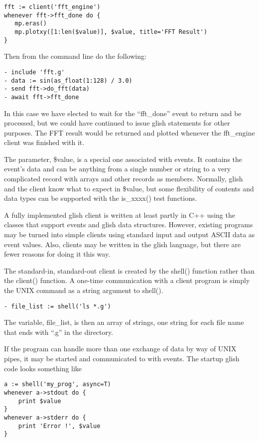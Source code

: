 \begin{verbatim}
fft := client('fft_engine')
whenever fft->fft_done do {
   mp.eras()
   mp.plotxy([1:len($value)], $value, title='FFT Result')
}
\end{verbatim}

Then from the command line do the following:

\begin{verbatim}
- include 'fft.g'
- data := sin(as_float(1:128) / 3.0)
- send fft->do_fft(data)
- await fft->fft_done
\end{verbatim}

    In this case we have elected to wait for the ``fft\_done'' event to return
and be processed, but we could have continued to issue glish statements for
other purposes.  The FFT result would be returned and plotted whenever the
fft\_engine client was finished with it.

    The parameter, \$value, is a special one associated with events.  It
contains the event's data and can be anything from a single number or
string to a very complicated record with arrays and other records as
members.  Normally, glish and the client know what to expect in \$value, but
some flexibility of contents and data types can be supported with the
is\_xxxx() test functions.

    A fully implemented glish client is written at least partly in C++
using the classes that support events and glish data structures.  However,
existing programs may be turned into simple clients using standard input
and output ASCII data as event values.  Also, clients may be written in the
glish language, but there are fewer reasons for doing it this way.

    The standard-in, standard-out client is created by the shell() function
rather than the client() function.  A one-time communication with a client
program is simply the UNIX command as a string argument to shell().

\begin{verbatim}
- file_list := shell('ls *.g')
\end{verbatim}

The variable, file\_list, is then an array of strings, one string for each
file name that ends with ``.g'' in the directory.

    If the program can handle more than one exchange of data by way of UNIX
pipes, it may be started and communicated to with events.  The startup
glish code looks something like

\begin{verbatim}
a := shell('my_prog', async=T)
whenever a->stdout do {
    print $value
}
whenever a->stderr do {
    print 'Error !', $value
}
\end{verbatim}

